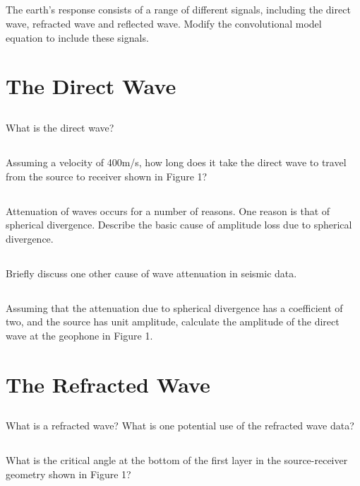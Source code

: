 \documentclass[a4paper, 10pt]{article}
\begin{document}
\subsection{}
The earth's response consists of a range of different signals, including the direct wave, refracted wave and reflected wave.  Modify the convolutional model equation to include these signals.
\section{The Direct Wave}
\subsection{}
What is the direct wave?
\subsection{}
Assuming a velocity of 400m/s, how long does it take the direct wave to travel from the source to receiver shown in Figure 1?
\subsection{}
Attenuation of waves occurs for a number of reasons. One reason is that of spherical divergence. Describe the basic cause of amplitude loss due to spherical divergence.
\subsection{}
Briefly discuss one other cause of wave attenuation in seismic data.
\subsection{}
Assuming that the attenuation due to spherical divergence has a coefficient of two, and the source has unit amplitude, calculate the amplitude of the direct wave at the geophone in Figure 1.
\section{The Refracted Wave}
\subsection{}
What is a refracted wave? What is one potential use of the refracted wave data?
\subsection{}
What is the critical angle at the bottom of the first layer in the source-receiver geometry shown in Figure 1?
\end{document}
